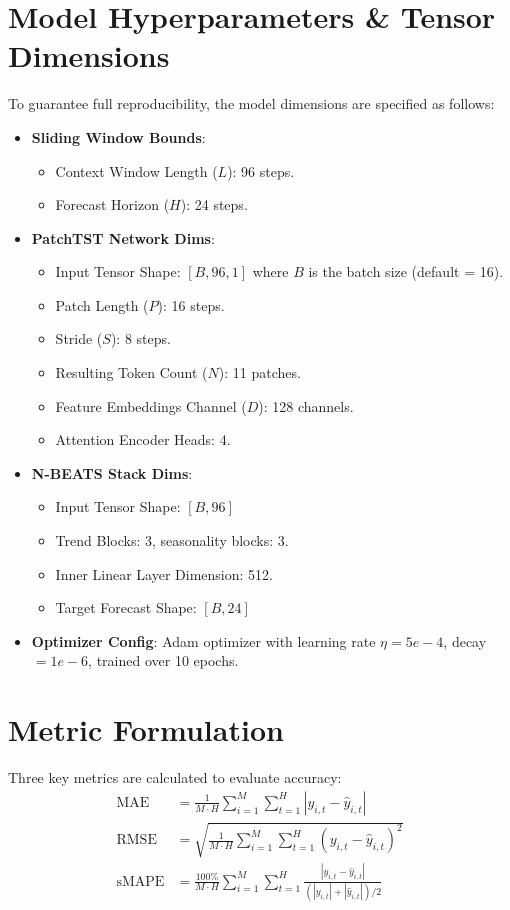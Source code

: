 \documentclass[11pt,journal,onecolumn]{IEEEtran}
\begin{document}
\section{Model Hyperparameters \& Tensor Dimensions}
To guarantee full reproducibility, the model dimensions are specified as follows:
\begin{itemize}
    \item \textbf{Sliding Window Bounds}:
    \begin{itemize}
        \item Context Window Length ($L$): 96 steps.
        \item Forecast Horizon ($H$): 24 steps.
    \end{itemize}
    \item \textbf{PatchTST Network Dims}:
    \begin{itemize}
        \item Input Tensor Shape: $[B, 96, 1]$ where $B$ is the batch size (default = 16).
        \item Patch Length ($P$): 16 steps.
        \item Stride ($S$): 8 steps.
        \item Resulting Token Count ($N$): 11 patches.
        \item Feature Embeddings Channel ($D$): 128 channels.
        \item Attention Encoder Heads: 4.
    \end{itemize}
    \item \textbf{N-BEATS Stack Dims}:
    \begin{itemize}
        \item Input Tensor Shape: $[B, 96]$
        \item Trend Blocks: 3, seasonality blocks: 3.
        \item Inner Linear Layer Dimension: 512.
        \item Target Forecast Shape: $[B, 24]$
    \end{itemize}
    \item \textbf{Optimizer Config}: Adam optimizer with learning rate $\eta = 5e-4$, decay $= 1e-6$, trained over 10 epochs.
\end{itemize}

\section{Metric Formulation}
Three key metrics are calculated to evaluate accuracy:
\begin{align}
\text{MAE} &= \frac{1}{M \cdot H} \sum_{i=1}^M\sum_{t=1}^H |y_{i,t} - \hat{y}_{i,t}| \\
\text{RMSE} &= \sqrt{\frac{1}{M \cdot H} \sum_{i=1}^M\sum_{t=1}^H (y_{i,t} - \hat{y}_{i,t})^2} \\
\text{sMAPE} &= \frac{100\%}{M \cdot H} \sum_{i=1}^M\sum_{t=1}^H \frac{|y_{i,t} - \hat{y}_{i,t}|}{(|y_{i,t}| + |\hat{y}_{i,t}|)/2}
\end{align}
\end{document}
